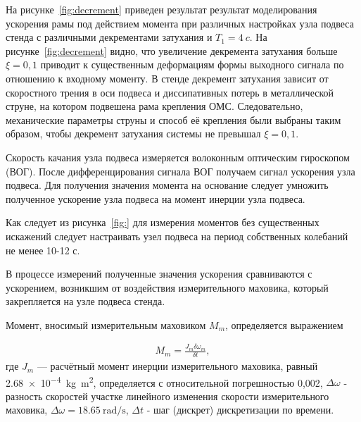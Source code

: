 На рисунке~\cref{fig:decrement} приведен результат результат моделирования ускорения рамы под действием момента при различных настройках узла подвеса стенда с различными декрементами затухания и $T_1 = \SI{4}{c}$. На рисунке~\cref{fig:decrement} видно, что увеличение декремента затухания больше $\xi = 0,1$ приводит к существенным деформациям формы выходного сигнала по отношению к входному моменту. В стенде декремент затухания зависит от скоростного трения в оси подвеса и диссипативных потерь в металлической струне, на котором подвешена рама крепления ОМС. Следовательно, механические параметры струны и способ её крепления были выбраны таким образом, чтобы декремент затухания системы не превышал $\xi = 0,1$. 

Скорость качания узла подвеса измеряется волоконным оптическим гироскопом (ВОГ). После дифференцирования сигнала ВОГ получаем сигнал ускорения узла подвеса. Для получения значения момента на основание следует умножить полученное ускорение узла подвеса на момент инерции узла подвеса. 

Как следует из рисунка~\cref{fig:} для измерения моментов без существенных искажений следует настраивать узел подвеса на период собственных колебаний не менее 10-12 с.

В процессе измерений полученные значения ускорения сравниваются с ускорением, возникшим от воздействия измерительного маховика, который закрепляется на узле подвеса стенда.

Момент, вносимый измерительным маховиком $M_m$, определяется выражением

\begin{samepage}
	\begin{equation}
		\label{eq:final_moment}
		\begin{alignedat}{2}
			M_m=\frac{J_m\delta\omega_m}{\delta t},
		\end{alignedat}
	\end{equation}
где $J_m$ — расчётный момент инерции измерительного маховика, равный 
\SI{2.68e-4}{\kilogram\metre\squared}, определяется с относительной погрешностью 0,002, $\Delta \omega$ - разность скоростей участке линейного изменения скорости измерительного маховика,  $\Delta \omega=\SI{18,65}{\radian\per\second}$, $\Delta t$ -  шаг (дискрет) дискретизации по времени.
\end{samepage}



